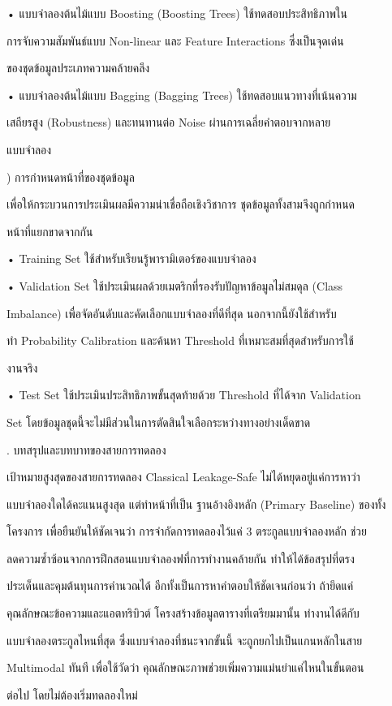 \documentclass[12pt,a4paper]{report}
\begin{document}
\noindent • แบบจำลองต้นไม้แบบ Boosting (Boosting Trees) ใช้ทดสอบประสิทธิภาพใน\par
การจับความสัมพันธ์แบบ Non-linear และ Feature Interactions ซึ่งเป็นจุดเด่น\par
ของชุดข้อมูลประเภทความคล้ายคลึง\par
\clearpage
\noindent • แบบจำลองต้นไม้แบบ Bagging (Bagging Trees) ใช้ทดสอบแนวทางที่เน้นความ\par
เสถียรสูง (Robustness) และทนทานต่อ Noise ผ่านการเฉลี่ยคำตอบจากหลาย\par
แบบจำลอง\par
{}) การกำหนดหน้าที่ของชุดข้อมูล\par
เพื่อให้กระบวนการประเมินผลมีความน่าเชื่อถือเชิงวิชาการ ชุดข้อมูลทั้งสามจึงถูกกำหนด\par
หน้าที่แยกขาดจากกัน\par
\noindent • Training Set ใช้สำหรับเรียนรู้พารามิเตอร์ของแบบจำลอง\par
\noindent • Validation Set ใช้ประเมินผลด้วยเมตริกที่รองรับปัญหาข้อมูลไม่สมดุล (Class\par
Imbalance) เพื่อจัดอันดับและคัดเลือกแบบจำลองที่ดีที่สุด นอกจากนี้ยังใช้สำหรับ\par
ทำ Probability Calibration และค้นหา Threshold ที่เหมาะสมที่สุดสำหรับการใช้\par
งานจริง\par
\noindent • Test Set ใช้ประเมินประสิทธิภาพขั้นสุดท้ายด้วย Threshold ที่ได้จาก Validation\par
Set โดยข้อมูลชุดนี้จะไม่มีส่วนในการตัดสินใจเลือกระหว่างทางอย่างเด็ดขาด\par
{}. บทสรุปและบทบาทของสายการทดลอง\par
เป้าหมายสูงสุดของสายการทดลอง Classical Leakage-Safe ไม่ได้หยุดอยู่แค่การหาว่า\par
แบบจำลองใดได้คะแนนสูงสุด แต่ทำหน้าที่เป็น ฐานอ้างอิงหลัก (Primary Baseline) ของทั้ง\par
โครงการ เพื่อยืนยันให้ชัดเจนว่า การจำกัดการทดลองไว้แค่ 3 ตระกูลแบบจำลองหลัก ช่วย\par
ลดความซ้ำซ้อนจากการฝึกสอนแบบจำลองฟที่การทำงานคล้ายกัน ทำให้ได้ข้อสรุปที่ตรง\par
ประเด็นและคุมต้นทุนการคำนวณได้ อีกทั้งเป็นการหาคำตอบให้ชัดเจนก่อนว่า ถ้ายึดแค่\par
คุณลักษณะข้อความและแอตทริบิวต์ โครงสร้างข้อมูลตารางที่เตรียมมานั้น ทำงานได้ดีกับ\par
แบบจำลองตระกูลไหนที่สุด ซึ่งแบบจำลองที่ชนะจากขั้นนี้ จะถูกยกไปเป็นแกนหลักในสาย\par
Multimodal ทันที เพื่อใช้วัดว่า คุณลักษณะภาพช่วยเพิ่มความแม่นยำแค่ไหนในขั้นตอน\par
ต่อไป โดยไม่ต้องเริ่มทดลองใหม่\par
\end{document}

